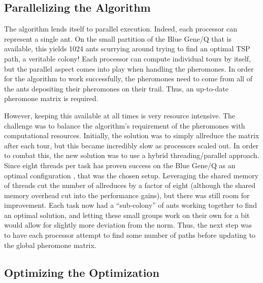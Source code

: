 \documentclass[twocolumn]{article}
\begin{document}
\subsection{Parallelizing the Algorithm}  \label{sec:parallel}

The algorithm lends itself to parallel execution. Indeed, each processor can
represent a single ant. On the small partition of the Blue Gene/Q that is
available, this yields 1024 ants scurrying around trying to find an optimal
TSP path, a veritable colony! Each processor can compute individual tours by
itself, but the parallel aspect comes into play when handling the pheromones.
In order for the algorithm to work successfully, the pheromones need to come from 
all of the ants depositing their pheromones on their trail. Thus, an up-to-date
pheromone matrix is required. 

However, keeping this available at all times is
very resource intensive. The challenge was to balance the algorithm's requirement
of the pheromones with computational resources. Initially, the solution was to
simply allreduce the matrix after each tour, but this became incredibly 
slow as processors scaled out. In order to combat this, the new solution was
to use a hybrid threading/parallel approach. Since eight threads per task has 
proven success on the Blue Gene/Q as an optimal configuration \cite{lolours},
that was the chosen setup. Leveraging the shared memory of threads cut the 
number of allreduces by a factor of eight (although the shared memory overhead
cut into the performance gains), but there was still room for improvement. Each
task now had a ``sub-colony'' of ants working together to find an optimal 
solution, and letting these small groups work on their own for a bit would allow
for slightly more deviation from the norm. Thus, the next step was to have 
each processor attempt to find some number of paths before updating to the global 
pheromone matrix. 

\subsection{Optimizing the Optimization} \label{sec:opt}
\end{document}

